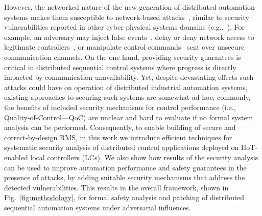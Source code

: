 
However, the networked nature of the new generation of distributed automation systems makes them susceptible to network-based attacks~\cite{wang_arxiv19}, similar to security vulnerabilities reported in other cyber-physical systems domains (e.g.,~\cite{pajic_csm17}). For example, an adversary may inject false events~\cite{802.15.4auth}, delay or deny network access to legitimate controllers~\cite{wirelessattack}, or manipulate control commands~\cite{ackattack2} sent over unsecure communication channels. On the one hand, providing security guarantees is critical in distributed sequential control systems where progress is directly impacted by communication unavailability. Yet, despite devastating effects such attacks could have on operation of distributed industrial automation systems, existing approaches to securing such systems are somewhat ad-hoc; commonly, the benefits of included security mechanisms for control performance (i.e., Quality-of-Control---QoC) are unclear and hard to evaluate if no formal system analysis can be performed.
%
Consequently, to enable building of secure and correct-by-design RMS, in this work we introduce efficient techniques for systematic security analysis of distributed control applications deployed on IIoT-enabled local controllers (LCs). We also show how results of the security analysis can be used to improve automation performance and safety guarantees in the presence of attacks, by adding suitable security mechanisms that address the detected vulnerabilities. This results in the overall framework, shown  in Fig.~\ref{fig:methodology}, for formal safety analysis and patching of distributed sequential automation systems under adversarial influences.
